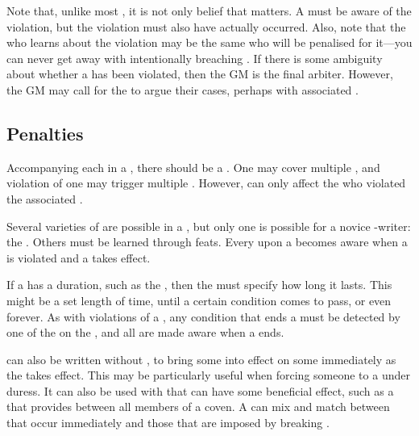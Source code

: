 Note that, unlike most , it is not only belief that matters.
A {\signatory} must be aware of the violation, but the violation must also have actually occurred.
Also, note that the {\signatory} who learns about the violation may be the same {\signatory} who will be penalised for it---you can never get away with intentionally breaching {\contract}.
If there is some ambiguity about whether a {\stipulation} has been violated, then the GM is the final arbiter.
However, the GM may call for the {\signatories} to argue their cases, perhaps with associated {\tests}.

\subsection{Penalties}

Accompanying each {\stipulation} in a {\contract}, there should be a {\contractpenalty}.
One {\contractpenalty} may cover multiple {\stipulations}, and violation of one {\stipulation} may trigger multiple {\penalties}.
However, {\penalties} can only affect the {\signatories} who violated the associated {\stipulations}.

Several varieties of {\contractpenalty} are possible in a {\contract}, but only one is possible for a novice {\contract}-writer: the {\liarscurse}.
Others must be learned through feats.
Every {\signatory} upon a {\contract} becomes aware when a {\stipulation} is violated and a {\contractpenalty} takes effect.

If a {\contractpenalty} has a duration, such as the {\liarscurse}, then the {\contract} must specify how long it lasts.
This might be a set length of time, until a certain condition comes to pass, or even forever.
As with violations of a {\stipulation}, any condition that ends a {\contractpenalty} must be detected by one of the {\signatories} on the {\contract}, and all {\signatories} are made aware when a {\contractpenalty} ends.

\capital{\contracts} can also be written without {\stipulations}, to bring some {\penalties} into effect on some {\signatories} immediately as the {\contract} takes effect.
This may be particularly useful when forcing someone to {\sign} a {\contract} under duress.
It can also be used with {\penalties} that can have some beneficial effect, such as a {\contract} that provides  between all members of a coven.
A {\contract} can mix and match between {\penalties} that occur immediately and those that are imposed by breaking {\stipulations}.


